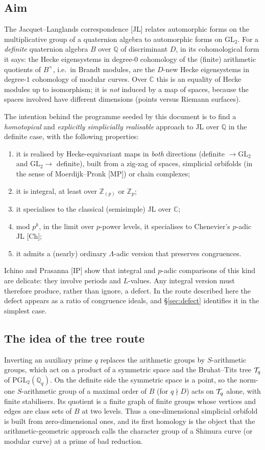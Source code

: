 \documentclass[11pt]{amsart}
\theoremstyle{plain}
\theoremstyle{definition}
\theoremstyle{remark}
\newcommand{\Q}{\mathbb{Q}}\newcommand{\Z}{\mathbb{Z}}\newcommand{\R}{\mathbb{R}}\newcommand{\C}{\mathbb{C}}
\newcommand{\GL}{\mathrm{GL}}\newcommand{\SL}{\mathrm{SL}}\newcommand{\PGL}{\mathrm{PGL}}
\begin{document}
\subsection{Aim}
The Jacquet--Langlands correspondence [JL] relates automorphic forms on the multiplicative group of a quaternion algebra to automorphic forms on $\GL_2$.
For a \emph{definite} quaternion algebra $B$ over $\Q$ of discriminant $D$, in its cohomological form it says: the Hecke eigensystems in degree-$0$ cohomology of the (finite) arithmetic quotients of $B^\times$, i.e.\ in Brandt modules, are the $D$-new Hecke eigensystems in degree-$1$ cohomology of modular curves.
Over $\C$ this is an equality of Hecke modules up to isomorphism; it is \emph{not} induced by a map of spaces, because the spaces involved have different dimensions (points versus Riemann surfaces).

The intention behind the programme seeded by this document is to find a \emph{homotopical} and \emph{explicitly simplicially realisable} approach to JL over $\Q$ in the definite case, with the following properties:
\begin{enumerate}[label=(\roman*)]
\item it is realised by Hecke-equivariant maps in \emph{both} directions (definite $\to\GL_2$ and $\GL_2\to$ definite), built from a zig-zag of spaces, simplicial orbifolds (in the sense of Moerdijk--Pronk [MP]) or chain complexes;
\item it is integral, at least over $\Z_{(p)}$ or $\Z_p$;
\item it specialises to the classical (semisimple) JL over $\C$;
\item mod $p^k$, in the limit over $p$-power levels, it specialises to Chenevier's $p$-adic JL [Ch];
\item it admits a (nearly) ordinary $\Lambda$-adic version that preserves congruences.
\end{enumerate}
Ichino and Prasanna [IP] show that integral and $p$-adic comparisons of this kind are delicate: they involve periods and $L$-values.
Any integral version must therefore produce, rather than ignore, a defect.
In the route described here the defect appears as a ratio of congruence ideals, and \S\ref{sec:defect} identifies it in the simplest case.

\subsection{The idea of the tree route}
Inverting an auxiliary prime $q$ replaces the arithmetic groups by $S$-arithmetic groups, which act on a product of a symmetric space and the Bruhat--Tits tree $\mathcal{T}_q$ of $\PGL_2(\Q_q)$.
On the definite side the symmetric space is a point, so the norm-one $S$-arithmetic group of a maximal order of $B$ (for $q\nmid D$) acts on $\mathcal{T}_q$ alone, with finite stabilisers.
Its quotient is a finite graph of finite groups whose vertices and edges are class sets of $B$ at two levels.
Thus a one-dimensional simplicial orbifold is built from zero-dimensional ones, and its first homology is the object that the arithmetic-geometric approach calls the character group of a Shimura curve (or modular curve) at a prime of bad reduction.
\end{document}
